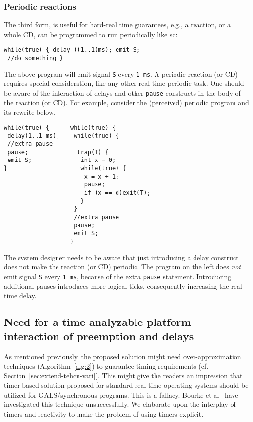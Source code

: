 \subsubsection{Periodic reactions}
\label{sec:periodic-reactions}

The third form, is useful for hard-real time guarantees, e.g., a
reaction, or a whole CD, can be programmed to run periodically like so:

{\small
\begin{verbatim}
while(true) { delay ((1..1)ms); emit S; 
 //do something }
\end{verbatim}
}

The above program will emit signal \texttt{S} every \texttt{1 ms}. A
periodic reaction (or CD) requires special consideration, like any other
real-time periodic task. One should be aware of the interaction of
delays and other \texttt{pause} constructs in the body of the reaction
(or CD). For example, consider the (perceived) periodic program and its
rewrite below.

{\small
\begin{verbatim}
while(true) {      while(true) {
 delay(1..1 ms);    while(true) { 
 //extra pause
 pause;              trap(T) {
 emit S;              int x = 0;
}                     while(true) {
                       x = x + 1;
                       pause;
                       if (x == d)exit(T);
                      }
                    }
                    //extra pause
                    pause;
                    emit S;
                   }
\end{verbatim}
}

The system designer needs to be aware that just introducing a delay
construct does not make the reaction (or CD) periodic. The program on
the left does \textit{not} emit signal \texttt{S} every \texttt{1 ms},
because of the extra \texttt{pause} statement. Introducing additional
pauses introduces more logical ticks, consequently increasing the
real-time delay.

\subsection{Need for a time analyzable platform -- interaction of
  preemption and delays}
\label{sec:inter-preempt-delays}

As mentioned previously, the proposed solution might need
over-approximation techniques (Algorithm~\ref{alg:2}) to guarantee
timing requirements (cf. Section~\ref{sec:extend-tehcn-vari}). This
might give the readers an impression that timer based solution proposed
for standard real-time operating systems should be utilized for
GALS/synchronous programs. This is a fallacy. Bourke et
al~\cite{Bourke2009a} have investigated this technique
unsuccessfully. We elaborate upon the interplay of timers and reactivity
to make the problem of using timers explicit.

